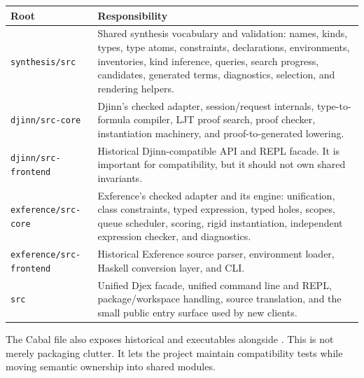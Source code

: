 \documentclass[10pt,letterpaper,oneside]{report}
\newcommand{\code}[1]{\texttt{\detokenize{#1}}}
\newcommand{\filepath}[1]{\nolinkurl{#1}}
\begin{document}
\begin{longtable}{@{}L{0.24\textwidth}L{0.68\textwidth}@{}}
\toprule
\textbf{Root} & \textbf{Responsibility} \\
\midrule
\endhead
\filepath{synthesis/src} & Shared synthesis vocabulary and validation: names, kinds, types, type atoms, constraints, declarations, environments, inventories, kind inference, queries, search progress, candidates, generated terms, diagnostics, selection, and rendering helpers. \\
\filepath{djinn/src-core} & Djinn's checked adapter, session/request internals, type-to-formula compiler, LJT proof search, proof checker, instantiation machinery, and proof-to-generated lowering. \\
\filepath{djinn/src-frontend} & Historical Djinn-compatible API and REPL facade. It is important for compatibility, but it should not own shared invariants. \\
\filepath{exference/src-core} & Exference's checked adapter and its engine: unification, class constraints, typed expression, typed holes, scopes, queue scheduler, scoring, rigid instantiation, independent expression checker, and diagnostics. \\
\filepath{exference/src-frontend} & Historical Exference source parser, environment loader, Haskell conversion layer, and CLI. \\
\filepath{src} & Unified Djex facade, unified command line and REPL, package/workspace handling, source translation, and the small public entry surface used by new clients. \\
\bottomrule
\end{longtable}

The Cabal file also exposes historical \code{djinn} and \code{exference} executables alongside \code{djex}. This is not merely packaging clutter. It lets the project maintain compatibility tests while moving semantic ownership into shared modules.
\end{document}
